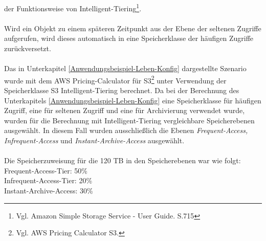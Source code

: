 der Funktionsweise von Intelligent-Tiering\footnote{Vgl. Amazon Simple Storage Service - User Guide. S.715\cite{AMZ18}}.
\\\\
Wird ein Objekt zu einem späteren Zeitpunkt aus der Ebene der seltenen Zugriffe aufgerufen, wird dieses automatisch in eine Speicherklasse der häufigen Zugriffe zurückversetzt.
\\\\
Das in Unterkapitel \ref{Anwendungsbeispiel-Leben-Konfig} dargestellte Szenario wurde mit dem AWS Pricing-Calculator für S3\footnote{Vgl.  AWS Pricing Calculator S3\cite{AMZ17-S3}.} unter Verwendung der Speicherklasse S3 Intelligent-Tiering berechnet. %
Da bei der Berechnung des Unterkapitels \ref{Anwendungsbeispiel-Leben-Konfig} eine Speicherklasse für häufigen Zugriff, eine für seltenen Zugriff und eine für Archivierung verwendet wurde, wurden für die Berechnung mit Intelligent-Tiering vergleichbare Speicherebenen ausgewählt. In diesem Fall wurden ausschließlich die Ebenen \textit{Frequent-Access, Infrequent-Access} und \textit{Instant-Archive-Access} ausgewählt. %
\\\\
Die Speicherzuweisung für die 120 TB in den Speicherebenen war wie folgt:\\
Frequent-Access-Tier: 50\% \\
Infrequent-Access-Tier: 20\%\\
Instant-Archive-Access: 30\%
\\
